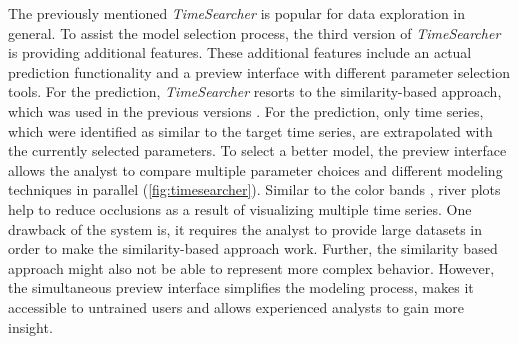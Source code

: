 \documentclass[electronic]{vgtc}             %
\begin{document}
The previously mentioned \textit{TimeSearcher} \cite{Hochheiser:2004, buono:2005} is popular for data exploration in general.
To assist the model selection process, the third version of \textit{TimeSearcher} \cite{buono:2007} is providing additional features.  
These additional features include an actual prediction functionality and a preview interface with different parameter selection tools.
For the prediction, \textit{TimeSearcher} resorts to the similarity-based approach, which was used in the previous versions \cite{buono:2005, Hochheiser:2004}.
For the prediction, only time series, which were identified as similar to the target time series, are extrapolated with the currently selected parameters.
To select a better model, the preview interface allows the analyst to compare multiple parameter choices and different modeling techniques in parallel (\autoref{fig:timesearcher}).
Similar to the color bands \cite{ichikawa:2002}, river plots help to reduce occlusions as a result of visualizing multiple time series.
One drawback of the system is, it requires the analyst to provide large datasets in order to make the similarity-based approach work.
Further, the similarity based approach might also not be able to represent more complex behavior.
However, the simultaneous preview interface simplifies the modeling process, makes it accessible to untrained users and allows experienced analysts to gain more insight.
\end{document}
